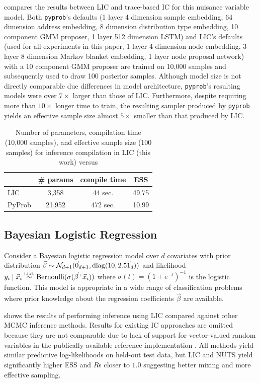 \documentclass[../../thesis.tex]{subfiles}
\begin{document}
 compares the results between LIC and trace-based IC
\citep{le2017inference} for this nuisance variable model. Both \texttt{pyprob}'s
defaults (1 layer 4 dimension sample embedding, 64 dimension address
embedding, 8 dimension distribution type embedding, 10 component GMM
proposer, 1 layer 512 dimension LSTM) and LIC's defaults (used for all
experiments in this paper, 1 layer 4 dimension node embedding, 3 layer 8
dimension Markov blanket embedding, 1 layer node proposal network) with a 10
component GMM proposer are trained on 10,000 samples and subsequently used to
draw 100 posterior samples. Although model size is not directly comparable due
differences in model architecture, \texttt{pyprob}'s resulting models were over $7\times$
larger than those of LIC. Furthermore, despite requiring more than $10\times$ longer
time to train, the resulting sampler produced by \texttt{pyprob} yields
an effective sample size almost $5\times$ smaller than that produced by LIC.
\begin{table}
  \centering
  \begin{tabular}{lccc}
    \toprule
           & \# params & compile time & ESS   \\
    \midrule
    LIC    & 3,358     & 44 sec.      & 49.75 \\
    PyProb & 21,952    & 472 sec.     & 10.99 \\
    \bottomrule
  \end{tabular}
  \caption{Number of parameters, compilation time (10,000 samples), and effective sample size (100 samples)
    for inference compilation in LIC (this work)
    versus \citep{pyprob2020}
  }\label{fig:nuisance}
\end{table}

\subsection{Bayesian Logistic Regression}
\label{ssec:blr}

Consider a Bayesian logistic regression model over $d$ covariates
with prior distribution
$\vec{\beta} \sim \mathcal{N}_{d+1}(\vec{0}_{d+1}, \operatorname*{\mathop{\mathrm{diag}}}(10, 2.5\vec{1}_{d}))$
and likelihood $y_i \mid \vx_i \simiid \text{Bernoulli}(\sigma(\vec{\beta}^\top \vx_i))$
where $\sigma(t) = (1 + e^{-t})^{-1}$ is the logistic function.
This model is appropriate in a wide range of classification problems where prior
knowledge about the regression coefficients $\vec{\beta}$ are available.

 shows the results of performing inference using LIC compared
against other MCMC inference methods. Results for existing IC approaches
\citep{le2017inference} are omitted because they are not comparable due to
lack of support for vector-valued random variables in the publically
available reference implementation \citep{pyprob2020}. All methods yield
similar predictive log-likelihoods on held-out test data, but LIC and NUTS
yield significantly higher ESS and $\widehat{R}$s closer to $1.0$ suggesting
better mixing and more effective sampling.
\end{document}
